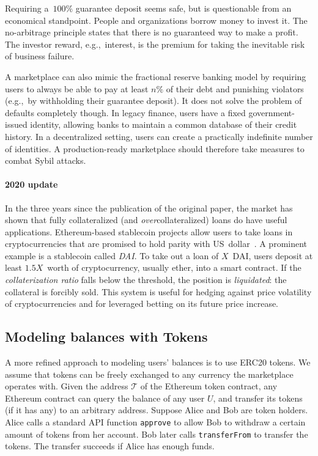 Requiring a~$100\%$ guarantee deposit seems safe, but is questionable from an economical standpoint.
People and organizations borrow money to invest it.
The no-arbitrage principle states that there is no guaranteed way to make a profit.
The investor reward, e.g.,~interest, is the premium for taking the inevitable risk of business failure.

A marketplace can also mimic the fractional reserve banking model by requiring users to always be able to pay at least $n\%$ of their debt and punishing violators (e.g.,~by withholding their guarantee deposit).
It does not solve the problem of defaults completely though.
In legacy finance, users have a fixed government-issued identity, allowing banks to maintain a common database of their credit history.
In a decentralized setting, users can create a practically indefinite number of identities.
A production-ready marketplace should therefore take measures to combat Sybil attacks.

\paragraph{2020 update}
In the three years since the publication of the original paper, the market has shown that fully collateralized (and \textit{over}collateralized) loans do have useful applications.
Ethereum-based stablecoin projects allow users to take loans in cryptocurrencies that are promised to hold parity with US~dollar~\cite{Mita2019}.
A prominent example is a stablecoin called \textit{DAI}.
To take out a loan of $X$~DAI, users deposit at least $1.5X$~worth of cryptocurrency, usually ether, into a smart contract.
If the \textit{collaterization ratio} falls below the threshold, the position is \textit{liquidated}: the collateral is forcibly sold.
This system is useful for hedging against price volatility of cryptocurrencies and for leveraged betting on its future price increase.


\subsection{Modeling balances with Tokens}

A more refined approach to modeling users' balances is to use ERC20 tokens.
We assume that tokens can be freely exchanged to any currency the marketplace operates with.
Given the address $\mathcal{T}$ of the Ethereum token contract, any Ethereum contract can query the balance of any user $U$, and transfer its tokens (if it has any) to an arbitrary address.
Suppose Alice and Bob are token holders.
Alice calls a standard API function \texttt{approve} to allow Bob to withdraw a certain amount of tokens from her account.
Bob later calls \texttt{transferFrom} to transfer the tokens.
The transfer succeeds if Alice has enough funds.

